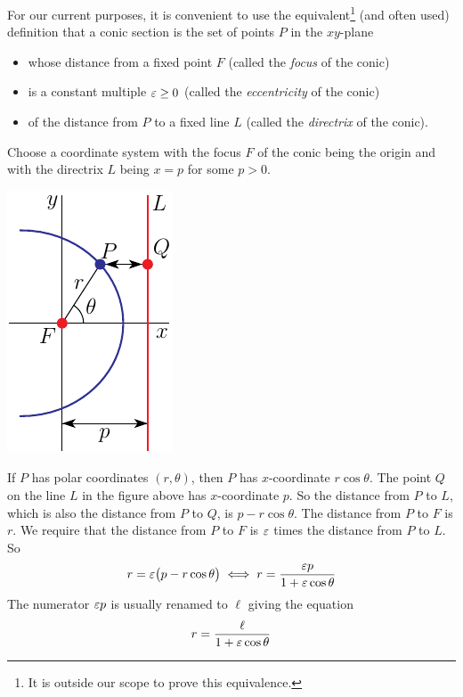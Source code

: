 \begin{eg}
{\begin{efig}
\begin{center}
\end{center}
\end{efig}
}
For our current purposes, it is convenient to use the 
equivalent\footnote{It is outside our scope to prove this equivalence.} 
(and often used) definition that a conic section is the set of points $P$ 
in the $xy$-plane 
\begin{itemize}\itemsep1pt \parskip0pt  %
\item
whose distance from a fixed point $F$ (called the \emph{focus} of the conic) 
\item
is a constant multiple $\varepsilon\ge 0$ (called the \emph{eccentricity} 
of the conic)
\item  
of the distance from $P$ to a fixed line $L$ (called the \emph{directrix} 
of the conic).
\end{itemize}
Choose a coordinate system with the focus $F$ of the conic being the origin
and with the directrix $L$ being $x=p$ for some $p>0$. 
\begin{efig}
\begin{center}
    \includegraphics{conic.pdf}
\end{center}
\end{efig}
If $P$ has polar coordinates $(r,\theta)$, then $P$ has $x$-coordinate
$r\cos\theta$. The point $Q$ on the line $L$ in the figure above 
has $x$-coordinate $p$.
So the distance from $P$ to $L$, which is also the distance from $P$ to
$Q$, is $p-r\cos\theta$.  The distance from $P$ to $F$ is $r$. We require that 
the distance from $P$ to $F$ is $\varepsilon$ times the distance from $P$ to $L$.
So
\begin{equation*}
r=\varepsilon\big(p-r\cos\theta\big)
\iff 
r=\frac{\varepsilon p}{1+\varepsilon\cos\theta}
\end{equation*}
The numerator $\varepsilon p$ is usually renamed to $\ell$ giving the equation
\begin{equation*}
r=\frac{\ell}{1+\varepsilon\cos\theta}
\end{equation*}
\end{eg}


